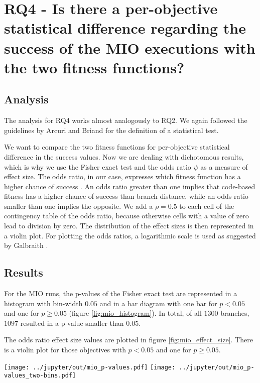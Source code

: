 \section[RQ4]{RQ4 - Is there a per-objective statistical difference regarding the success of the MIO executions with the two fitness functions?}

\subsection{Analysis}

The analysis for RQ4 works almost analogously to RQ2.
We again followed the guidelines by Arcuri and Briand \cite{arcuri2011practical} for the definition of a statistical test.

We want to compare the two fitness functions for per-objective statistical difference in the success values. Now we are dealing with dichotomous results, which is why we use the Fisher exact test and the odds ratio $\psi$ as a measure of effect size.
The odds ratio, in our case, expresses which fitness function has a higher chance of success \cite{arcuri2011practical}.
An odds ratio greater than one implies that code-based fitness has a higher chance of success than branch distance, while an odds ratio smaller than one implies the opposite.
We add a $\rho = 0.5$ to each cell of the contingency table of the odds ratio, because otherwise cells with a value of zero lead to division by zero.
The distribution of the effect sizes is then represented in a violin plot.
For plotting the odds ratios, a logarithmic scale is used as suggested by Galbraith \cite{galbraith1988note}.

\subsection{Results}

For the MIO runs, the p-values of the Fisher exact test are represented in a histogram with bin-width $0.05$ and in a bar diagram with one bar for $p < 0.05$ and one for $p \geq 0.05$ (figure \ref{fig:mio_histogram}).
In total, of all $1300$ branches, $1097$ resulted in a p-value smaller than $0.05$.

The odds ratio effect size values are plotted in figure \ref{fig:mio_effect_size}.
There is a violin plot for those objectives with $p < 0.05$ and one for $p \geq 0.05$.


\begin{minipage}{\textwidth}
	\texttt{[image: ../jupyter/out/mio\_p-values.pdf]}
	\texttt{[image: ../jupyter/out/mio\_p-values\_two-bins.pdf]}
	\label{fig:mio_histogram}
\end{minipage}

